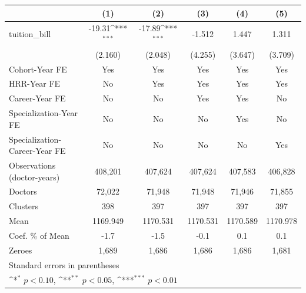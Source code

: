 {
\def\sym#1{\ifmmode^{#1}\else\(^{#1}\)\fi}
\begin{tabular}{l*{5}{c}}
\hline\hline
                    &\multicolumn{1}{c}{(1)}         &\multicolumn{1}{c}{(2)}         &\multicolumn{1}{c}{(3)}         &\multicolumn{1}{c}{(4)}         &\multicolumn{1}{c}{(5)}         \\
\hline
tuition\_bill        &      -19.31\sym{***}&      -17.89\sym{***}&      -1.512         &       1.447         &       1.311         \\
                    &     (2.160)         &     (2.048)         &     (4.255)         &     (3.647)         &     (3.709)         \\
[1em]
Cohort-Year FE      &         Yes         &         Yes         &         Yes         &         Yes         &         Yes         \\
[1em]
HRR-Year FE         &          No         &         Yes         &         Yes         &         Yes         &         Yes         \\
[1em]
Career-Year FE      &          No         &          No         &         Yes         &         Yes         &          No         \\
[1em]
Specialization-Year FE&          No         &          No         &          No         &         Yes         &          No         \\
[1em]
Specialization-Career-Year FE&          No         &          No         &          No         &          No         &         Yes         \\
\hline
Observations (doctor-years)&     408,201         &     407,624         &     407,624         &     407,583         &     406,828         \\
Doctors             &      72,022         &      71,948         &      71,948         &      71,946         &      71,855         \\
Clusters            &         398         &         397         &         397         &         397         &         397         \\
Mean                &    1169.949         &    1170.531         &    1170.531         &    1170.589         &    1170.978         \\
Coef. \% of Mean    &        -1.7         &        -1.5         &        -0.1         &         0.1         &         0.1         \\
Zeroes              &       1,689         &       1,686         &       1,686         &       1,686         &       1,681         \\
\hline\hline
\multicolumn{6}{l}{\footnotesize Standard errors in parentheses}\\
\multicolumn{6}{l}{\footnotesize \sym{*} \(p<0.10\), \sym{**} \(p<0.05\), \sym{***} \(p<0.01\)}\\
\end{tabular}
}
